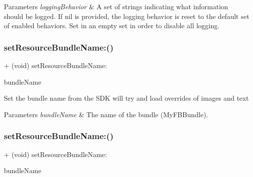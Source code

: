 \begin{DoxyParams}{Parameters}
{\em logging\+Behavior} & A set of strings indicating what information should be logged. If nil is provided, the logging behavior is reset to the default set of enabled behaviors. Set in an empty set in order to disable all logging. \\
\hline
\end{DoxyParams}
\mbox{\label{interfaceFBSettings_a60a15470e22d07ad1c7d4a789712e3c1}} 
\subsubsection{\texorpdfstring{set\+Resource\+Bundle\+Name\+:()}{setResourceBundleName:()}\hspace{0.1cm}{\footnotesize\ttfamily [1/5]}}
{\footnotesize\ttfamily + (void) set\+Resource\+Bundle\+Name\+: \begin{DoxyParamCaption}\item[{(N\+S\+String $\ast$)}]{bundle\+Name }\end{DoxyParamCaption}}

Set the bundle name from the S\+DK will try and load overrides of images and text


\begin{DoxyParams}{Parameters}
{\em bundle\+Name} & The name of the bundle (My\+F\+B\+Bundle). \\
\hline
\end{DoxyParams}
\mbox{\label{interfaceFBSettings_a60a15470e22d07ad1c7d4a789712e3c1}} 
\subsubsection{\texorpdfstring{set\+Resource\+Bundle\+Name\+:()}{setResourceBundleName:()}\hspace{0.1cm}{\footnotesize\ttfamily [2/5]}}
{\footnotesize\ttfamily + (void) set\+Resource\+Bundle\+Name\+: \begin{DoxyParamCaption}\item[{(N\+S\+String $\ast$)}]{bundle\+Name }\end{DoxyParamCaption}}

